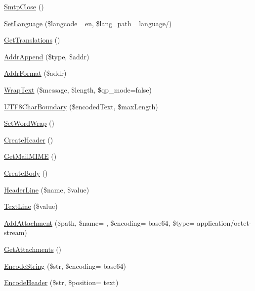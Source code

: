 \begin{DoxyCompactItemize}
\hyperlink{class_p_h_p_mailer_a75de786aacfa46b08d85b1a4767540f7}{Smtp\+Close} ()
\item 
\hyperlink{class_p_h_p_mailer_a4a065c25349d014db6662e46d5799f5d}{Set\+Language} (\$langcode= \textquotesingle{}en\textquotesingle{}, \$lang\+\_\+path= \textquotesingle{}language/\textquotesingle{})
\item 
\hyperlink{class_p_h_p_mailer_a218cef52cde1be078f38a7d3f809473a}{Get\+Translations} ()
\item 
\hyperlink{class_p_h_p_mailer_a86ec05cad2d96cb13c6e7e651d0ca6db}{Addr\+Append} (\$type, \$addr)
\item 
\hyperlink{class_p_h_p_mailer_a47602c3097e143dc59cd431c49ed1679}{Addr\+Format} (\$addr)
\item 
\hyperlink{class_p_h_p_mailer_af0cfed04bf275549c08405d7a9cb0b24}{Wrap\+Text} (\$message, \$length, \$qp\+\_\+mode=false)
\item 
\hyperlink{class_p_h_p_mailer_a3d5be5858a6b0ceae9ba7ca6a08e8642}{U\+T\+F8\+Char\+Boundary} (\$encoded\+Text, \$max\+Length)
\item 
\hyperlink{class_p_h_p_mailer_a35ce192d6072d907b5af0d5b0accf44d}{Set\+Word\+Wrap} ()
\item 
\hyperlink{class_p_h_p_mailer_a182f1cac2b3845db908b579848b33e26}{Create\+Header} ()
\item 
\hyperlink{class_p_h_p_mailer_a61c61128b767d40c68817a5669904e5d}{Get\+Mail\+M\+I\+M\+E} ()
\item 
\hyperlink{class_p_h_p_mailer_af2b0d3cd8b14c97c73d7b2a3f65ab44b}{Create\+Body} ()
\item 
\hyperlink{class_p_h_p_mailer_a4e72c338b9daa2f01adfdac70aabcdca}{Header\+Line} (\$name, \$value)
\item 
\hyperlink{class_p_h_p_mailer_a91e75c41715677fd4e0c4345b83d6551}{Text\+Line} (\$value)
\item 
\hyperlink{class_p_h_p_mailer_a8fb5a4fbe30da22b921411dba4121ccc}{Add\+Attachment} (\$path, \$name= \textquotesingle{}\textquotesingle{}, \$encoding= \textquotesingle{}base64\textquotesingle{}, \$type= \textquotesingle{}application/octet-\/stream\textquotesingle{})
\item 
\hyperlink{class_p_h_p_mailer_a6cfd0e9ca3819d11e1f8cd1bd8671d6f}{Get\+Attachments} ()
\item 
\hyperlink{class_p_h_p_mailer_a9522c3641a5e89e4d2dbfa1872d310a7}{Encode\+String} (\$str, \$encoding= \textquotesingle{}base64\textquotesingle{})
\item 
\hyperlink{class_p_h_p_mailer_acb260e4133453682cb02b0a950ef5b05}{Encode\+Header} (\$str, \$position= \textquotesingle{}text\textquotesingle{})

\end{DoxyCompactItemize}
